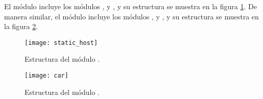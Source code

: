 \begin{sloppypar}
El módulo  incluye los módulos ,
 y , y su
estructura se muestra en la figura \ref{fig:static_host}. De manera similar, el
módulo  incluye los módulos , 
y , y su estructura se muestra en la figura
\ref{fig:car}.
\end{sloppypar}

\begin{figure}[th!]
\centering
\texttt{[image: static\_host]}
\decoRule
\caption[Estructura del módulo ]{Estructura del módulo
.}
\label{fig:static_host}
\end{figure}

\begin{figure}[th!]
\centering
\texttt{[image: car]}
\decoRule
\caption[Estructura del módulo ]{Estructura del módulo .}
\label{fig:car}
\end{figure}
